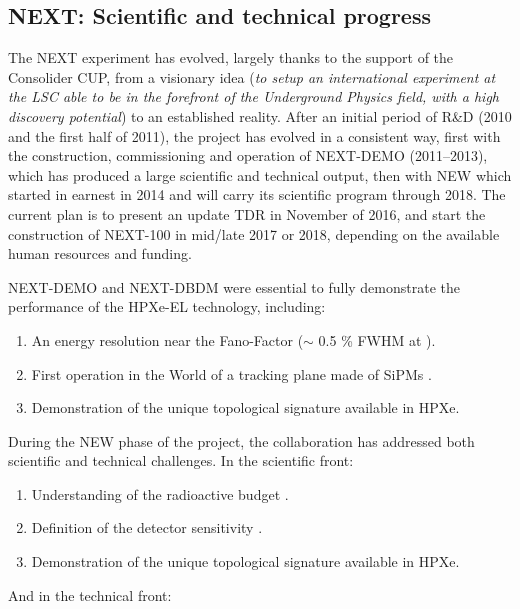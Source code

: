 \subsection*{NEXT: Scientific and technical progress}

The NEXT experiment has evolved, largely thanks to the support of the Consolider CUP, from a visionary idea ({\em to setup an international experiment at the LSC able to be in the forefront of the Underground Physics field, with a high discovery potential}) to an established reality. After an initial period of R\&D (2010 and the first half of 2011), the project has evolved in a consistent way, first with the construction, commissioning and operation of NEXT-DEMO (2011--2013), which has produced a large scientific and technical output, then with NEW which started in earnest in 2014 and will carry its scientific program through 2018. The current plan is to present an update TDR in November of 2016, and start the construction of NEXT-100 in mid/late 2017 or 2018, depending on the available human resources and funding. 
 
 NEXT-DEMO and NEXT-DBDM were essential to fully demonstrate the performance of the HPXe-EL technology, including:
 \begin{enumerate}
\item An energy resolution near the Fano-Factor ($\sim$ 0.5 \% FWHM at \Qbb)\cite{Alvarez:2012yxw,Alvarez:2012zsz}.
\item First operation in the World of a tracking plane made of SiPMs \cite{Alvarez:2013gxa}.
\item Demonstration of the unique topological signature available in HPXe\cite{Ferrario:2015kta}.
\end{enumerate}

During the NEW phase of the project, the collaboration has addressed both scientific and technical challenges. In the scientific front:

\begin{enumerate}
\item Understanding of the radioactive budget \cite{Cebrian:2015jna, Alvarez:2014kvs, Dafni:2014yja}.
\item Definition of the detector sensitivity \cite{Martin-Albo:2015rhw}.
\item Demonstration of the unique topological signature available in HPXe\cite{Ferrario:2015kta}.
\end{enumerate}

And in the technical front:

